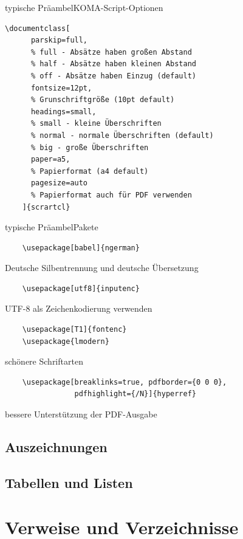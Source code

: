 \begin{Frame}[fragile]{typische Präambel}{KOMA-Script-Optionen}
  \begin{lstlisting}[gobble=4]
    \documentclass[
      parskip=full,
      % full - Absätze haben großen Abstand
      % half - Absätze haben kleinen Abstand
      % off - Absätze haben Einzug (default)
      fontsize=12pt,
      % Grunschriftgröße (10pt default)
      headings=small,
      % small - kleine Überschriften
      % normal - normale Überschriften (default)
      % big - große Überschriften
      paper=a5,
      % Papierformat (a4 default)
      pagesize=auto
      % Papierformat auch für PDF verwenden
    ]{scrartcl}
  \end{lstlisting}
\end{Frame}

\begin{Frame}[fragile]{typische Präambel}{Pakete}
  \begin{lstlisting}
    \usepackage[babel]{ngerman}
  \end{lstlisting}
  Deutsche Silbentrennung und deutsche Übersetzung
  \begin{lstlisting}
    \usepackage[utf8]{inputenc}
  \end{lstlisting}
  UTF-8 als Zeichenkodierung verwenden
  \begin{lstlisting}
    \usepackage[T1]{fontenc}
    \usepackage{lmodern}
  \end{lstlisting}
  schönere Schriftarten
  \begin{lstlisting}
    \usepackage[breaklinks=true, pdfborder={0 0 0},
                pdfhighlight={/N}]{hyperref}
  \end{lstlisting}
  bessere Unterstützung der PDF-Ausgabe
\end{Frame}

\subsection{Auszeichnungen}


\subsection{Tabellen und Listen}

\section{Verweise und Verzeichnisse}

